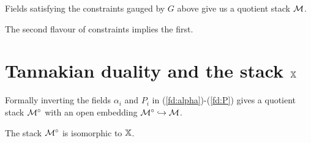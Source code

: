 \documentclass{amsart}
\theoremstyle{definition}
\begin{document}

\begin{definition}
Fields satisfying the constraints gauged by $G$ above give us a quotient stack $\mathcal{M}$.
\end{definition}

\begin{remark}
The second flavour of constraints implies the first.
\end{remark}

\section{Tannakian duality and the stack $\mathbb{X}$}

Formally inverting the fields $\alpha_i$ and $P_i$ in (\ref{fd:alpha})-(\ref{fd:P}) gives a quotient stack ${\mathcal{M}}^\circ$ with an open embedding ${\mathcal{M}}^\circ \hookrightarrow \mathcal{M}$.

\begin{proposition}\label{prop:tannaka}
The stack ${\mathcal{M}}^\circ$ is isomorphic to $\mathbb{X}$.
\end{proposition}
\end{document}
